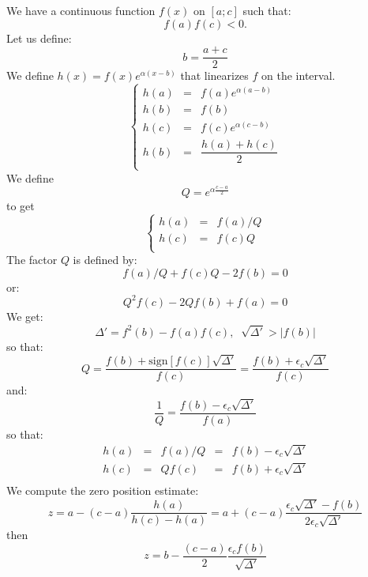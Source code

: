 \documentclass[aps,12pt]{revtex4}
\begin{document}
We have a continuous function $f(x)$ on $[a;c]$ such that:
$$f(a)f(c)<0.$$
Let us define:
$$
	b = \dfrac{a+c}{2}
$$
We define $h(x)=f(x)e^{\alpha(x-b)}$ that linearizes $f$ on the interval.
$$
\left\lbrace
\begin{array}{rcl}
	h(a) & = & f(a)e^{\alpha(a-b)}\\
	h(b) & = & f(b)\\
	h(c) & = & f(c) e^{\alpha(c-b)}\\
	h(b) & = & \dfrac{h(a)+h(c)}{2}\\
\end{array}
\right.
$$
We define
$$
Q = e^{\alpha\frac{c-a}{2}}
$$
to get
$$	
\left\lbrace
\begin{array}{rcl}
	h(a) & = & f(a)/Q\\
 	h(c) & = & f(c)Q\\
\end{array}
\right.
$$
The factor $Q$ is defined by:
$$
	f(a)/Q + f(c)Q - 2f(b) = 0
$$
or:
$$
	Q^2 f(c) - 2Qf(b) + f(a) = 0 
$$
We get:
$$
	\Delta' = f^2(b) - f(a)f(c), \;\; \sqrt{\Delta'} > |f(b)|
$$
so that:
$$
	Q = \dfrac{f(b) + \mathrm{sign}[ f(c) ] \sqrt{\Delta'}}{f(c)} = \dfrac{f(b) + \epsilon_c \sqrt{\Delta'}}{f(c)}
$$
and:
$$
	\dfrac{1}{Q} = \frac{f(b) - \epsilon_c \sqrt{\Delta'}}{f(a)}
$$
so that:
$$
\begin{array}{rcccl}
	h(a) & = & f(a)/Q & = & f(b) - \epsilon_c \sqrt{\Delta'}\\
	h(c) & = & Qf(c)  & = & f(b) + \epsilon_c \sqrt{\Delta'}\\
\end{array}
$$
We compute the zero position estimate:
$$
	z = a - (c-a) \dfrac{h(a)}{h(c)-h(a)} = a + (c-a) \dfrac{\epsilon_c \sqrt{\Delta'} - f(b)}{2 \epsilon_c \sqrt{\Delta'}}
$$
then
$$
	z = b - \dfrac{(c-a)}{2} \dfrac{\epsilon_c f(b)}{\sqrt{\Delta'}}
$$
 
\end{document}
